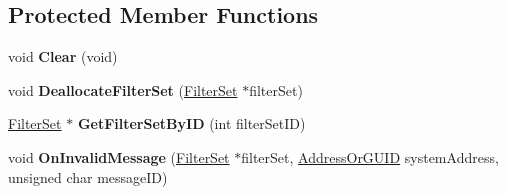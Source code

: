 \subsection*{Protected Member Functions}
\begin{DoxyCompactItemize}
\item 
\hypertarget{class_rak_net_1_1_message_filter_ae2d416c3ebede73088cf219cf9309e4e}{void {\bfseries Clear} (void)}\label{class_rak_net_1_1_message_filter_ae2d416c3ebede73088cf219cf9309e4e}

\item 
\hypertarget{class_rak_net_1_1_message_filter_aadb0843dd0f4447b6b60b53c4461e3b8}{void {\bfseries Deallocate\-Filter\-Set} (\hyperlink{struct_rak_net_1_1_filter_set}{Filter\-Set} $\ast$filter\-Set)}\label{class_rak_net_1_1_message_filter_aadb0843dd0f4447b6b60b53c4461e3b8}

\item 
\hypertarget{class_rak_net_1_1_message_filter_ad87187e65f3a4757597a2a3b44368744}{\hyperlink{struct_rak_net_1_1_filter_set}{Filter\-Set} $\ast$ {\bfseries Get\-Filter\-Set\-By\-I\-D} (int filter\-Set\-I\-D)}\label{class_rak_net_1_1_message_filter_ad87187e65f3a4757597a2a3b44368744}

\item 
\hypertarget{class_rak_net_1_1_message_filter_a1a2b7fd76e9f63c8a5846074fb38f8c0}{void {\bfseries On\-Invalid\-Message} (\hyperlink{struct_rak_net_1_1_filter_set}{Filter\-Set} $\ast$filter\-Set, \hyperlink{struct_rak_net_1_1_address_or_g_u_i_d}{Address\-Or\-G\-U\-I\-D} system\-Address, unsigned char message\-I\-D)}\label{class_rak_net_1_1_message_filter_a1a2b7fd76e9f63c8a5846074fb38f8c0}

\end{DoxyCompactItemize}
